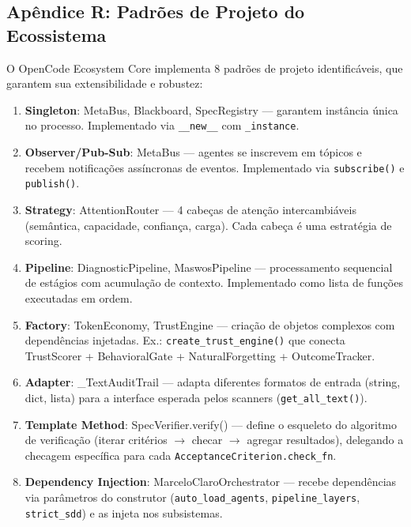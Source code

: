 \subsection{Apêndice R: Padrões de Projeto do Ecossistema}
\label{sec:apendice-padroes}

O OpenCode Ecosystem Core implementa 8 padrões de projeto identificáveis, que garantem sua extensibilidade e robustez:

\begin{enumerate}
  \item \textbf{Singleton}: MetaBus, Blackboard, SpecRegistry — garantem instância única no processo. Implementado via \texttt{\_\_new\_\_} com \texttt{\_instance}.
  
  \item \textbf{Observer/Pub-Sub}: MetaBus — agentes se inscrevem em tópicos e recebem notificações assíncronas de eventos. Implementado via \texttt{subscribe()} e \texttt{publish()}.
  
  \item \textbf{Strategy}: AttentionRouter — 4 cabeças de atenção intercambiáveis (semântica, capacidade, confiança, carga). Cada cabeça é uma estratégia de scoring.
  
  \item \textbf{Pipeline}: DiagnosticPipeline, MaswosPipeline — processamento sequencial de estágios com acumulação de contexto. Implementado como lista de funções executadas em ordem.
  
  \item \textbf{Factory}: TokenEconomy, TrustEngine — criação de objetos complexos com dependências injetadas. Ex.: \texttt{create\_trust\_engine()} que conecta TrustScorer + BehavioralGate + NaturalForgetting + OutcomeTracker.
  
  \item \textbf{Adapter}: \_TextAuditTrail — adapta diferentes formatos de entrada (string, dict, lista) para a interface esperada pelos scanners (\texttt{get\_all\_text()}).
  
  \item \textbf{Template Method}: SpecVerifier.verify() — define o esqueleto do algoritmo de verificação (iterar critérios $\to$ checar $\to$ agregar resultados), delegando a checagem específica para cada \texttt{AcceptanceCriterion.check\_fn}.
  
  \item \textbf{Dependency Injection}: MarceloClaroOrchestrator — recebe dependências via parâmetros do construtor (\texttt{auto\_load\_agents}, \texttt{pipeline\_layers}, \texttt{strict\_sdd}) e as injeta nos subsistemas.
\end{enumerate}

